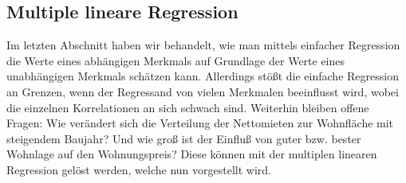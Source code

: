 \subsection{Multiple lineare Regression}
\label{sec:mult_reg}


Im letzten Abschnitt haben wir behandelt, wie man mittels einfacher Regression die Werte eines abhängigen Merkmals auf Grundlage der Werte eines unabhängigen Merkmals schätzen kann.
Allerdings stößt die einfache Regression an Grenzen, wenn der Regressand von vielen Merkmalen beeinflusst wird, wobei die einzelnen Korrelationen an sich schwach sind.
Weiterhin bleiben offene Fragen: 
Wie verändert sich die Verteilung der Nettomieten zur Wohnfläche mit steigendem Baujahr?
Und wie groß ist der Einfluß von guter bzw. bester Wohnlage auf den Wohnungspreis? 
Diese können mit der multiplen linearen Regression gelöst werden, welche nun vorgestellt wird.

